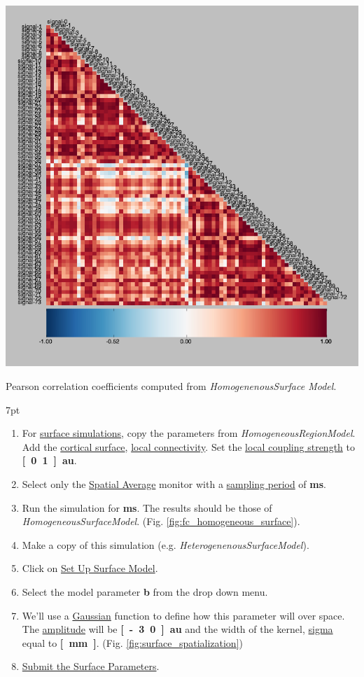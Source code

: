 \documentclass{tufte-handout}
\newenvironment{simulation}{%
  \def\FrameCommand{%
    \hspace{1pt}%
    {\color{ForestGreen}\vrule width 2pt}%
    {\color{simulationshade}\vrule width 4pt}%
    \colorbox{simulationshade}%
  }%
  \MakeFramed{\advance\hsize-\width\FrameRestore}%
  \noindent\hspace{-4.55pt}%
  \begin{adjustwidth}{}{7pt}%
  \vspace{2pt}\vspace{2pt}%
}
{%
  \vspace{2pt}\end{adjustwidth}\endMakeFramed%
}
\begin{document}
\begin{marginfigure}
  \includegraphics[width=\linewidth]{Handout_UI_HeterogenousModelAndStimulation_PearsonHomogenousSurface.png}%
  \caption{Pearson correlation coefficients computed from \textit{HomogenenousSurface
Model}.}%
  \label{fig:fc_homogeneous_surface}%
\end{marginfigure}


\begin{simulation}
\begin{enumerate}
\item For \underline{surface simulations}, copy the parameters from \textit{HomogeneousRegionModel}. Add the \underline{cortical surface}, \underline{local connectivity}. Set the \underline{local coupling strength} to \textbf{\unit[0.1]{au}}.
\item Select only the \underline{Spatial Average} monitor with a \underline{sampling period} of \textbf{\unit[1]{ms}}.
\item Run the simulation for \textbf{\unit[2000]{ms}}. The results should be those of \textit{HomogeneousSurfaceModel}. (Fig. \ref{fig:fc_homogeneous_surface}).
\item Make a copy of this simulation (e.g. \textit{HeterogenenousSurfaceModel}).
\item Click on \underline{Set Up Surface Model}.
\item Select the model parameter \textbf{b} from the drop down menu.
\item We'll use a \underline{Gaussian} function to define how this parameter will over space. The \underline{amplitude} will be \textbf{\unit[-3.0]{au}} and the width of the kernel, \underline{sigma} equal to \textbf{\unit[15][mm]}. (Fig. \ref{fig:surface_spatialization})
\item \underline{Submit the Surface Parameters}. 
\end{enumerate}
\end{simulation}
\end{document}
